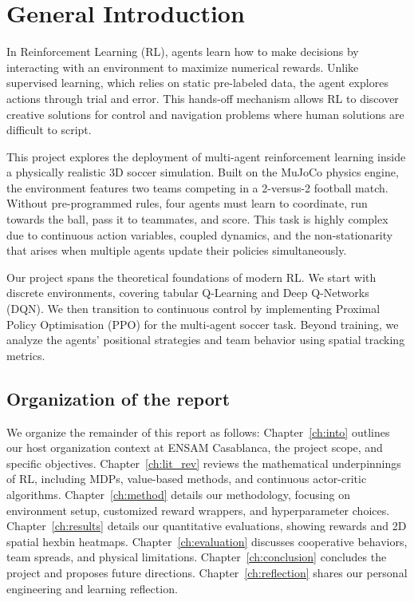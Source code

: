 \chapter*{General Introduction}
\label{ch:intoGen}

In Reinforcement Learning (RL), agents learn how to make decisions by interacting with an environment to maximize numerical rewards. Unlike supervised learning, which relies on static pre-labeled data, the agent explores actions through trial and error. This hands-off mechanism allows RL to discover creative solutions for control and navigation problems where human solutions are difficult to script.

This project explores the deployment of multi-agent reinforcement learning inside a physically realistic 3D soccer simulation. Built on the MuJoCo physics engine, the environment features two teams competing in a 2-versus-2 football match. Without pre-programmed rules, four agents must learn to coordinate, run towards the ball, pass it to teammates, and score. This task is highly complex due to continuous action variables, coupled dynamics, and the non-stationarity that arises when multiple agents update their policies simultaneously.

Our project spans the theoretical foundations of modern RL. We start with discrete environments, covering tabular Q-Learning and Deep Q-Networks (DQN). We then transition to continuous control by implementing Proximal Policy Optimisation (PPO) for the multi-agent soccer task. Beyond training, we analyze the agents' positional strategies and team behavior using spatial tracking metrics.

\section*{Organization of the report}
\label{sec:intro_org}

We organize the remainder of this report as follows:
Chapter~\ref{ch:into} outlines our host organization context at ENSAM Casablanca, the project scope, and specific objectives.
Chapter~\ref{ch:lit_rev} reviews the mathematical underpinnings of RL, including MDPs, value-based methods, and continuous actor-critic algorithms.
Chapter~\ref{ch:method} details our methodology, focusing on environment setup, customized reward wrappers, and hyperparameter choices.
Chapter~\ref{ch:results} details our quantitative evaluations, showing rewards and 2D spatial hexbin heatmaps.
Chapter~\ref{ch:evaluation} discusses cooperative behaviors, team spreads, and physical limitations.
Chapter~\ref{ch:conclusion} concludes the project and proposes future directions.
Chapter~\ref{ch:reflection} shares our personal engineering and learning reflection.
